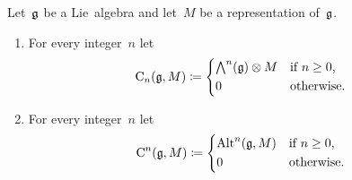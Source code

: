 \begin{definition}
  \label{construction of lie algebra homology and cohomology}
  Let~$\mathfrak{g}$ be a Lie~algebra and let~$M$ be a representation of~$\mathfrak{g}$.
  \begin{enumerate}
    \item
      For every integer~$n$ let
      \[
        \Chain_n(\glie, M)
        \defined
        \begin{cases*}
          \Exterior^n(\glie) \otimes M  & if~$n \geq 0$,  \\
          0                             & otherwise.
        \end{cases*}
      \]
    \item
      For every integer~$n$ let
      \[
        \Chain^n(\glie, M)
        \defined
        \begin{cases*}
          \Alt^n(\glie, M)  & if~$n \geq 0$,  \\
          0                 & otherwise.
        \end{cases*}
      \]
  \end{enumerate}
\end{definition}


